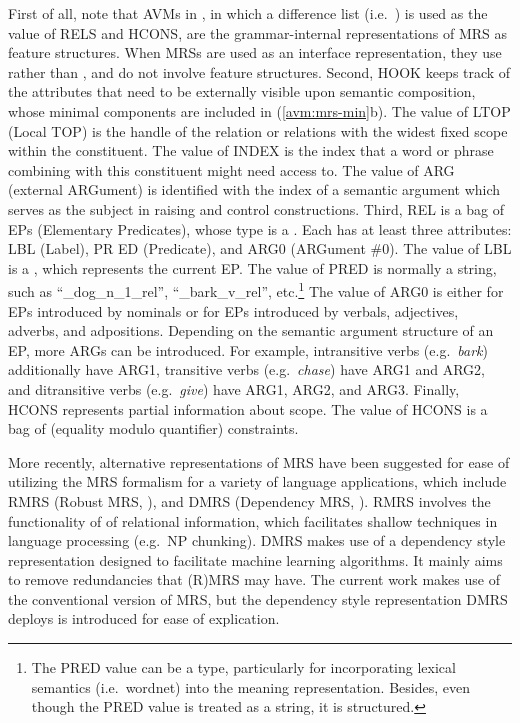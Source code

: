\noindent First of all, note that AVMs in , in
which a difference list (i.e.\ ) is used as the value
of RELS and HCONS, are the grammar-internal representations of MRS as
feature structures.  When MRSs are used as an interface
representation, they use  rather than , and
do not involve feature structures. Second, HOOK keeps track of the
attributes that need to be externally visible upon semantic
composition, whose minimal components are included in
(\ref{avm:mrs-min}b). The value of LTOP (Local TOP) is the handle of
the relation or relations with the widest fixed scope within the
constituent. The value of INDEX is the index that a word or phrase
combining with this constituent might need access to. The value of ARG
(external ARGument) is identified with the index of a semantic
argument which serves as the subject in raising and control
constructions.
Third, REL is a bag of EPs (Elementary Predicates),
whose type is a . Each  has at least three
attributes: LBL (Label), PR ED (Predicate), and ARG0 (ARGument
\#0). The value of LBL is a , which represents the current
EP. The value of PRED is normally a string, such as
``\_dog\_n\_1\_rel'', ``\_bark\_v\_rel'', etc.\footnote{The PRED value can
  be a type, particularly for incorporating lexical semantics
  (i.e.\ wordnet) into the meaning representation. Besides, even
  though the PRED value is treated as a string, it is structured.}
The value of ARG0 is either  for EPs introduced by
nominals or  for EPs introduced by verbals, adjectives,
adverbs, and adpositions.  Depending on the semantic argument
structure of an EP, more ARGs can be introduced. For example,
intransitive verbs (e.g.\ \textit{bark}) additionally have ARG1,
transitive verbs (e.g.\ \textit{chase}) have ARG1 and ARG2, and
ditransitive verbs (e.g.\ \textit{give}) have ARG1, ARG2, and
ARG3. Finally, HCONS represents partial information about scope.  The
value of HCONS is a bag of  (equality modulo quantifier)
constraints.


More recently, alternative representations of MRS have been suggested
for ease of utilizing the MRS formalism for a variety of language
applications, which include RMRS (Robust MRS, \citealt{copestake:07}),
and DMRS (Dependency MRS, \citealt{copestake:09}).  RMRS involves the
functionality of  of relational information,
which facilitates shallow techniques in language processing (e.g.\ NP
chunking).  DMRS makes use of a dependency style representation
designed to facilitate machine learning algorithms. It mainly aims to
remove redundancies that (R)MRS may have.  The current work makes use
of the conventional version of MRS, but the dependency style
representation DMRS deploys is introduced for ease of explication.



